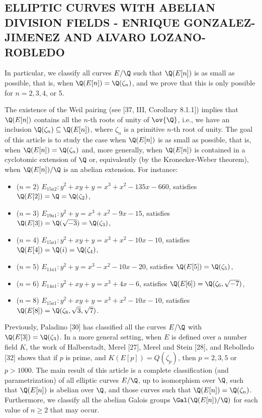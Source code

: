 \subsection{ELLIPTIC CURVES WITH ABELIAN DIVISION FIELDS - ENRIQUE GONZALEZ-JIMENEZ AND ALVARO LOZANO-ROBLEDO}

In particular, we classify all curves $E/\Q$ such that $\Q(E[n])$ is as small as possible, that is, when $\Q(E[n]) = \Q(\zeta_n)$, and we prove that this is only possible for $n = 2, 3, 4$, or 5. 

The existence of the Weil pairing (see [37, III, Corollary 8.1.1]) implies that $\Q(E[n])$ contains all the $n$-th roots of unity of $\ov{\Q}$, i.e., we have an inclusion $\Q(\zeta_n) \subseteq \Q(E[n])$, where $\zeta_n$ is a primitive $n$-th root of unity. The goal of this article is to study the case when $\Q(E[n])$ is as small as possible, that is, when $\Q(E[n]) = \Q(\zeta_n)$ and, more generally, when $\Q(E[n])$ is contained in a cyclotomic extension of $\Q$ or, equivalently (by the Kronecker-Weber theorem), when $\Q(E[n])/\Q$ is an abelian extension. For instance:
	\begin{itemize}
	\item ($n= 2$) $E_{15a2}: y^2 + xy + y= x^3 + x^2 - 135x - 660$, satisfies $\Q(E[2])= \Q= \Q(\zeta_2)$, 
	\item ($n= 3$) $E_{19a1}: y^2 + y= x^3 + x^2 - 9x - 15$, satisfies $\Q(E[3])= \Q(\sqrt{-3})= \Q(\zeta_3)$,
	\item ($n= 4$) $E_{15a1}: y^2 + xy + y= x^3 + x^2 - 10x - 10$, satisfies $\Q(E[4])= \Q(i)= \Q(\zeta_4)$,
	\item ($n= 5$) $E_{11a1}: y^2 + y= x^3 - x^2 - 10x - 20$, satisfies $\Q(E[5])= \Q(\zeta_5)$, 
	\item ($n= 6$) $E_{14a1}: y^2 + xy + y= x^3 + 4x - 6$, satisfies $\Q(E[6])= \Q(\zeta_6, \sqrt{-7})$,
	\item ($n= 8$) $E_{15a1}: y^2 + xy + y= x^3 + x^2 - 10x - 10$, satisfies $\Q(E[8])= \Q(\zeta_8, \sqrt{3}, \sqrt{7})$. 
	\end{itemize}


Previously, Paladino [30] has classified all the curves $E/\Q$ with $\Q(E[3])= \Q(\zeta_3)$. In a more general setting, when $E$ is defined over a number field $K$, the work of Halberstadt, Merel [27], Merel and Stein [28], and Rebolledo [32] shows that if $p$ is prime, and $K(E[p])= Q(\zeta_p)$, then $p= 2, 3, 5$ or $p > 1000$. The main result of this article is a complete classification (and parametrization) of all elliptic curves $E/\Q$, up to isomorphism over $\Q$, such that $\Q(E[n])$ is abelian over $\Q$, and those curves such that $\Q(E[n])= \Q(\zeta_n)$. Furthermore, we classify all the abelian Galois groups $\Gal(\Q(E[n])/\Q)$ for each value of $n \geq 2$ that may occur.


